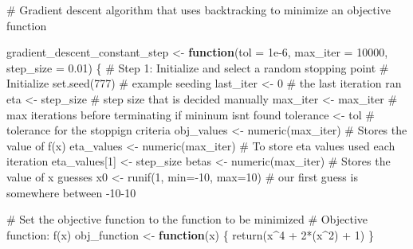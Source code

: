 \documentclass[
  letterpaper,
  DIV=11,
  numbers=noendperiod]{scrartcl}
\newenvironment{Shaded}{\begin{snugshade}}{\end{snugshade}}
\newcommand{\AttributeTok}[1]{\textcolor[rgb]{0.40,0.45,0.13}{#1}}
\newcommand{\CommentTok}[1]{\textcolor[rgb]{0.37,0.37,0.37}{#1}}
\newcommand{\ControlFlowTok}[1]{\textcolor[rgb]{0.00,0.23,0.31}{\textbf{#1}}}
\newcommand{\DecValTok}[1]{\textcolor[rgb]{0.68,0.00,0.00}{#1}}
\newcommand{\FloatTok}[1]{\textcolor[rgb]{0.68,0.00,0.00}{#1}}
\newcommand{\FunctionTok}[1]{\textcolor[rgb]{0.28,0.35,0.67}{#1}}
\newcommand{\NormalTok}[1]{\textcolor[rgb]{0.00,0.23,0.31}{#1}}
\newcommand{\OtherTok}[1]{\textcolor[rgb]{0.00,0.23,0.31}{#1}}
\newcommand{\SpecialCharTok}[1]{\textcolor[rgb]{0.37,0.37,0.37}{#1}}
\begin{document}
\begin{Shaded}
\begin{Highlighting}[]
\CommentTok{\# Gradient descent algorithm that uses backtracking to minimize an objective function}

\NormalTok{gradient\_descent\_constant\_step }\OtherTok{\textless{}{-}} \ControlFlowTok{function}\NormalTok{(}\AttributeTok{tol =} \FloatTok{1e{-}6}\NormalTok{, }\AttributeTok{max\_iter =} \DecValTok{10000}\NormalTok{, }\AttributeTok{step\_size =} \FloatTok{0.01}\NormalTok{) \{}
  \CommentTok{\# Step 1: Initialize and select a random stopping point}
  \CommentTok{\# Initialize}
  \FunctionTok{set.seed}\NormalTok{(}\DecValTok{777}\NormalTok{) }\CommentTok{\# example seeding }
\NormalTok{  last\_iter }\OtherTok{\textless{}{-}} \DecValTok{0} \CommentTok{\# the last iteration ran}
\NormalTok{  eta }\OtherTok{\textless{}{-}}\NormalTok{ step\_size }\CommentTok{\# step size that is decided manually }
\NormalTok{  max\_iter }\OtherTok{\textless{}{-}}\NormalTok{ max\_iter }\CommentTok{\# max iterations before terminating if mininum isn\textquotesingle{}t found}
\NormalTok{  tolerance }\OtherTok{\textless{}{-}}\NormalTok{ tol }\CommentTok{\# tolerance for the stoppign criteria }
\NormalTok{  obj\_values }\OtherTok{\textless{}{-}} \FunctionTok{numeric}\NormalTok{(max\_iter) }\CommentTok{\# Stores the value of f(x)}
\NormalTok{  eta\_values }\OtherTok{\textless{}{-}} \FunctionTok{numeric}\NormalTok{(max\_iter)  }\CommentTok{\# To store eta values used each iteration}
\NormalTok{  eta\_values[}\DecValTok{1}\NormalTok{] }\OtherTok{\textless{}{-}}\NormalTok{ step\_size}
\NormalTok{  betas }\OtherTok{\textless{}{-}} \FunctionTok{numeric}\NormalTok{(max\_iter) }\CommentTok{\# Stores the value of x guesses}
\NormalTok{  x0 }\OtherTok{\textless{}{-}} \FunctionTok{runif}\NormalTok{(}\DecValTok{1}\NormalTok{, }\AttributeTok{min=}\SpecialCharTok{{-}}\DecValTok{10}\NormalTok{, }\AttributeTok{max=}\DecValTok{10}\NormalTok{) }\CommentTok{\# our first guess is somewhere between {-}10{-}10}
  
  \CommentTok{\# Set the objective function to the function to be minimized }
  \CommentTok{\# Objective function: f(x)}
\NormalTok{  obj\_function }\OtherTok{\textless{}{-}} \ControlFlowTok{function}\NormalTok{(x) \{}
    \FunctionTok{return}\NormalTok{(x}\SpecialCharTok{\^{}}\DecValTok{4} \SpecialCharTok{+} \DecValTok{2}\SpecialCharTok{*}\NormalTok{(x}\SpecialCharTok{\^{}}\DecValTok{2}\NormalTok{) }\SpecialCharTok{+} \DecValTok{1}\NormalTok{) }
\NormalTok{  \}}
  

\end{Highlighting}
\end{Shaded}
\end{document}

